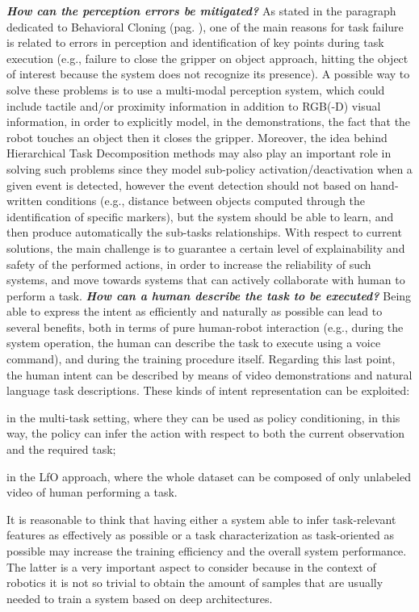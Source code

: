 \newline \textbf{\textit{How can the perception errors be mitigated?}} As stated in the paragraph dedicated to Behavioral Cloning (pag. \pageref{sec:lfo}), one of the main reasons for task failure is related to errors in perception and identification of key points during task execution (e.g., failure to close the gripper on object approach, hitting the object of interest because the system does not recognize its presence). A possible way to solve these problems is to use a multi-modal perception system, which could include tactile and/or proximity information in addition to RGB(-D) visual information, in order to explicitly model, in the demonstrations, the fact that the robot touches an object then it closes the gripper. Moreover, the idea behind Hierarchical Task Decomposition methods may also play an important role in solving such problems since they model sub-policy activation/deactivation when a given event is detected, however the event detection should not based on hand-written conditions (e.g., distance between objects computed through the identification of specific markers), but the system should be able to learn, and then produce automatically the sub-tasks relationships. With respect to current solutions, the main challenge is to guarantee a certain level of explainability and safety of the performed actions, in order to increase the reliability of such systems, and move towards systems that can actively collaborate with human to perform a task.
\newline \textbf{\textit{How can a human describe the task to be executed?}} Being able to express the intent as efficiently and naturally as possible can lead to several benefits, both in terms of pure human-robot interaction (e.g., during the system operation, the human can describe the task to execute using a voice command), and during the training procedure itself. Regarding this last point, the human intent can be described by means of video demonstrations and natural language task descriptions. These kinds of intent representation can be exploited: \begin{enumerate*}[label=\textbf{(\arabic*)}]
    \item in the multi-task setting, where they can be used as policy conditioning, in this way, the policy can infer the action with respect to both the current observation and the required task;
    \item in the LfO approach, where the whole dataset can be composed of only unlabeled video of human performing a task.
\end{enumerate*} 
It is reasonable to think that having either a system able to infer task-relevant features as effectively as possible or a task characterization as task-oriented as possible may increase the training efficiency and the overall system performance. The latter is a very important aspect to consider because in the context of robotics it is not so trivial to obtain the amount of samples that are usually needed to train a system based on deep architectures.

